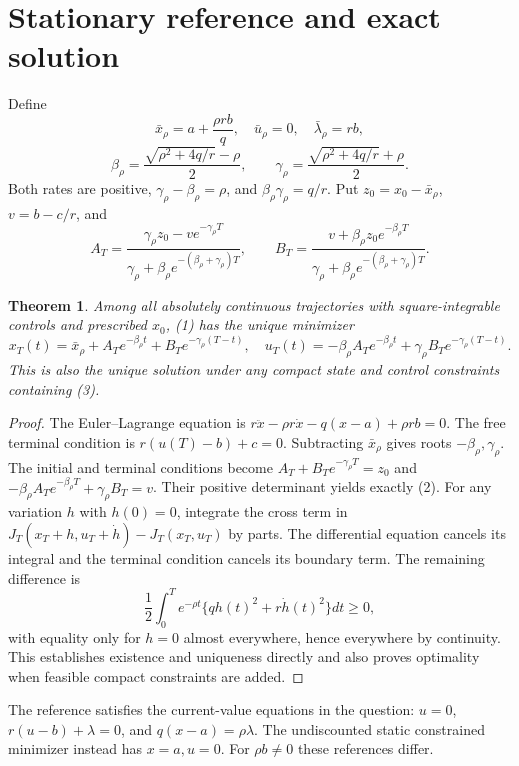 \documentclass[11pt]{article}
\newtheorem{theorem}{Theorem}
\theoremstyle{definition}
\begin{document}
\section*{Stationary reference and exact solution}
Define
\[
 \bar x_\rho=a+\frac{\rho r b}{q},\quad\bar u_\rho=0,
 \quad\bar\lambda_\rho=rb,
\]
\[
 \beta_\rho=\frac{\sqrt{\rho^2+4q/r}-\rho}{2},\qquad
 \gamma_\rho=\frac{\sqrt{\rho^2+4q/r}+\rho}{2}.
\]
Both rates are positive, $\gamma_\rho-\beta_\rho=\rho$, and
$\beta_\rho\gamma_\rho=q/r$. Put $z_0=x_0-\bar x_\rho$,
$v=b-c/r$, and
\[
 A_T=\frac{\gamma_\rho z_0-v e^{-\gamma_\rho T}}
              {\gamma_\rho+\beta_\rho e^{-(\beta_\rho+\gamma_\rho)T}},
 \qquad
 B_T=\frac{v+\beta_\rho z_0e^{-\beta_\rho T}}
              {\gamma_\rho+\beta_\rho e^{-(\beta_\rho+\gamma_\rho)T}}.
                                                               \tag{2}
\]
\begin{theorem}
Among all absolutely continuous trajectories with square-integrable
controls and prescribed $x_0$, (1) has the unique minimizer
\[
 x_T(t)=\bar x_\rho+A_Te^{-\beta_\rho t}
                       +B_Te^{-\gamma_\rho(T-t)},\quad
 u_T(t)=-\beta_\rho A_Te^{-\beta_\rho t}
                       +\gamma_\rho B_Te^{-\gamma_\rho(T-t)}.     \tag{3}
\]
This is also the unique solution under any compact state and control
constraints containing (3).
\end{theorem}
\begin{proof}
The Euler--Lagrange equation is
$r\ddot x-\rho r\dot x-q(x-a)+\rho rb=0$.
The free terminal condition is $r(u(T)-b)+c=0$.
Subtracting $\bar x_\rho$ gives roots $-\beta_\rho,\gamma_\rho$.
The initial and terminal conditions become
$A_T+B_Te^{-\gamma_\rho T}=z_0$ and
$-\beta_\rho A_Te^{-\beta_\rho T}+\gamma_\rho B_T=v$.
Their positive determinant yields exactly (2).
For any variation $h$ with $h(0)=0$, integrate the cross term in
$J_T(x_T+h,u_T+\dot h)-J_T(x_T,u_T)$ by parts. The differential equation
cancels its integral and the terminal condition cancels its boundary term.
The remaining difference is
\[
 \frac12\int_0^T e^{-\rho t}\{q h(t)^2+r\dot h(t)^2\}dt\ge0,
\]
with equality only for $h=0$ almost everywhere, hence everywhere by
continuity. This establishes existence and uniqueness directly and also
proves optimality when feasible compact constraints are added.
\end{proof}
The reference satisfies the current-value equations in the question:
$u=0$, $r(u-b)+\lambda=0$, and $q(x-a)=\rho\lambda$.
The undiscounted static constrained minimizer instead has $x=a,u=0$.
For $\rho b\ne0$ these references differ.
\end{document}
